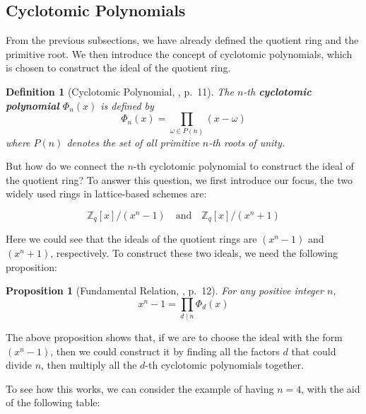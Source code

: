 \documentclass[12pt]{article}
\newtheorem{definition}{Definition}[section]
\newtheorem{proposition}{Proposition}[section]
\begin{document}
\subsection{Cyclotomic Polynomials}

From the previous subsections, we have already defined the quotient ring and the primitive root.
We then introduce the concept of cyclotomic polynomials, 
which is chosen to construct the ideal of the quotient ring.
\cite[p.~3]{survey}

\begin{definition}[Cyclotomic Polynomial, \cite{cyclotomic}, p.~11]
    The $n$-th \textbf{cyclotomic polynomial} $\Phi_n(x)$ is defined by
    \begin{equation*}
        \Phi_n(x) = \prod_{\omega \in P(n)} (x - \omega)
    \end{equation*}
    where $P(n)$ denotes the set of all primitive $n$-th roots of unity.
\end{definition}

But how do we connect the $n$-th cyclotomic polynomial to construct the ideal of the quotient ring?
To answer this question, we first introduce our focus, 
the two widely used rings in lattice-based schemes are:

\begin{equation*}
    \mathbb{Z}_q[x] / (x^n - 1) \quad \text{and} \quad \mathbb{Z}_q[x] / (x^n + 1)
\end{equation*}
\cite[p.~3]{survey}

Here we could see that the ideals of the quotient rings are $(x^n - 1)$ and $(x^n + 1)$, respectively.
To construct these two ideals, we need the following proposition:

\begin{proposition}[Fundamental Relation, \cite{cyclotomic}, p.~12]
    For any positive integer $n$, 
    \begin{equation*}
        x^n - 1 = \prod_{d \mid n} \Phi_d(x)
    \end{equation*}
\end{proposition}

The above proposition shows that, if we are to choose the ideal with the form $(x^n - 1)$, 
then we could construct it by finding all the factors $d$ that could divide $n$, 
then multiply all the $d$-th cyclotomic polynomials together.

To see how this works, we can consider the example of having $n = 4$, 
with the aid of the following table:
\end{document}
